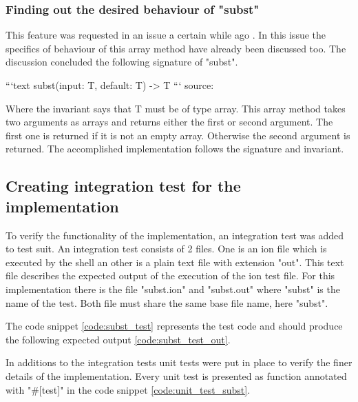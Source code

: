 \subsubsection{Finding out the desired behaviour of "subst"}\label{subst_desired_behaviour}

This feature was requested in an issue a certain while ago \cite{ion_shell_subst_issue}.
In this issue the specifics of behaviour of this array method have already been discussed too.
The discussion concluded the following signature of "subst".

```text
subst(input: T, default: T) -> T
```
source: \cite{issue_subst_request}

Where the invariant says that T must be of type array.
This array method takes two arguments as arrays and returns either the first or second argument.
The first one is returned if it is not an empty array. Otherwise the second argument is returned.
The accomplished implementation follows the signature and invariant.

\subsection{Creating integration test for the implementation}\label{subst_test}

To verify the functionality of the implementation, an integration test was added to test suit.
An integration test consists of 2 files. One is an ion file which is executed by the shell an other is a plain text file with extension "out".
This text file describes the expected output of the execution of the ion test file.
For this implementation there is the file "subst.ion" and "subst.out"
where "subst" is the name of the test. Both file must share the same base file name, here "subst".

The code snippet \ref{code:subst_test} represents the test code and should
produce the following expected output \ref{code:subst_test_out}.

In additions to the integration tests unit tests were put in place to verify the finer details of the implementation.
Every unit test is presented as function annotated with "\#[test]" in the code snippet \ref{code:unit_test_subst}.


